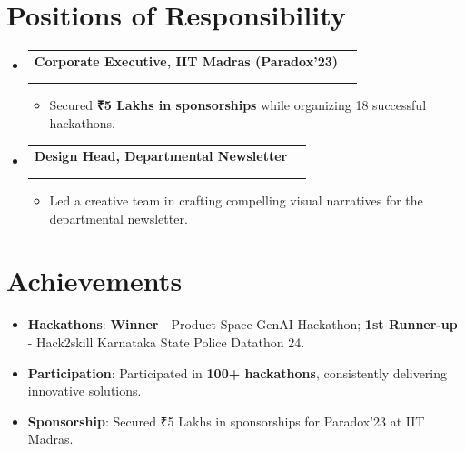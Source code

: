 \documentclass[A4paper,5pt]{article}
\makeatletter
\renewcommand{\resumeItem}[1]{%
  \item\small{#1 \vspace{-2pt}}%
}
\newcommand{\resumeItemWithTitle}[2]{
  \item\small{
    \textbf{#1}: #2 \vspace{-2pt}
  }
}
\newcommand{\resumeSubheading}[4]{%
  \vspace{-1pt}\item
    \begin{tabular*}{0.97\textwidth}{l@{\extracolsep{\fill}}r}
      \textbf{#1} & #2 \\
      \if\relax\detokenize{#3}\relax
      \else
        \textit{#3} & \textit{#4} \\
      \fi
    \end{tabular*}\vspace{-5pt}
}
\newcommand{\resumeSubHeadingListStart}{\begin{itemize}[leftmargin=*]}
\newcommand{\resumeSubHeadingListEnd}{\end{itemize}}
\newcommand{\resumeItemListStart}{\begin{itemize}}
\newcommand{\resumeItemListEnd}{\end{itemize}\vspace{-5pt}}
\makeatother
\begin{document}
\section{Positions of Responsibility}
  \resumeSubHeadingListStart
    \resumeSubheading
      {Corporate Executive, IIT Madras (Paradox'23)}{}{}{}
      \resumeItemListStart
        \resumeItem{Secured \textbf{₹5 Lakhs in sponsorships} while organizing 18 successful hackathons.}
      \resumeItemListEnd

    \resumeSubheading
      {Design Head, Departmental Newsletter}{}{}{}
      \resumeItemListStart
        \resumeItem{Led a creative team in crafting compelling visual narratives for the departmental newsletter.}
      \resumeItemListEnd
  \resumeSubHeadingListEnd
\vspace{-5pt}

\section{Achievements}
  \resumeSubHeadingListStart
    \resumeItemWithTitle{Hackathons}{\textbf{Winner} - Product Space GenAI Hackathon; \textbf{1st Runner-up} - Hack2skill Karnataka State Police Datathon 24.}
    \resumeItemWithTitle{Participation}{Participated in \textbf{100+ hackathons}, consistently delivering innovative solutions.}
    \resumeItemWithTitle{Sponsorship}{Secured ₹5 Lakhs in sponsorships for Paradox'23 at IIT Madras.}
  \resumeSubHeadingListEnd
\end{document}
